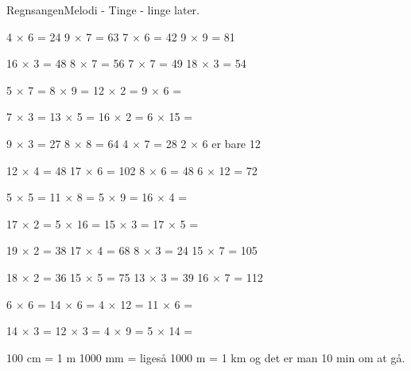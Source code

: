 \begin{sang}{Regnsangen}{Melodi - Tinge - linge later.}
\begin{vers}
4 $\times$ 6 = 24
9 $\times$ 7 = 63
7 $\times$ 6 = 42
9 $\times$ 9 = 81
\end{vers}
\begin{vers}
16 $\times$ 3 = 48
8 $\times$ 7 = 56
7 $\times$ 7 = 49
18 $\times$ 3 = 54
\end{vers}
\begin{vers}
5 $\times$ 7 = 
8 $\times$ 9 =
12 $\times$ 2 =
9 $\times$ 6 =
\end{vers}
\begin{vers}
7 $\times$ 3 =
13 $\times$ 5 =
16 $\times$ 2 =
6 $\times$ 15 =
\end{vers}
\begin{vers}
9 $\times$ 3 = 27
8 $\times$ 8 = 64
4 $\times$ 7 = 28
2 $\times$ 6 er bare 12
\end{vers}
\begin{vers}
12 $\times$ 4 = 48
17 $\times$ 6 = 102
8 $\times$ 6 = 48
6 $\times$ 12 = 72
\end{vers}
\begin{vers}
5 $\times$ 5 =
11 $\times$ 8 =
5 $\times$ 9 =
16 $\times$ 4 =
\end{vers}
\begin{vers}
17 $\times$ 2 =
5 $\times$ 16 =
15 $\times$ 3 =
17 $\times$ 5 =
\end{vers}
\begin{vers}
19 $\times$ 2 = 38
17 $\times$ 4 = 68
8 $\times$ 3 = 24
15 $\times$ 7 = 105
\end{vers}
\begin{vers}
18 $\times$ 2 = 36
15 $\times$ 5 = 75
13 $\times$ 3 = 39
16 $\times$ 7 = 112
\end{vers}
\begin{vers}
6 $\times$ 6 =
14 $\times$ 6 =
4 $\times$ 12 =
11 $\times$ 6 =
\end{vers}
\begin{vers}
14 $\times$ 3 =
12 $\times$ 3 =
4 $\times$ 9 =
5 $\times$ 14 =
\end{vers}
\begin{vers}
100 cm = 1 m
1000 mm = ligeså
1000 m = 1 km
og det er man 10 min om at gå.
\end{vers}
\laps
\end{sang}
